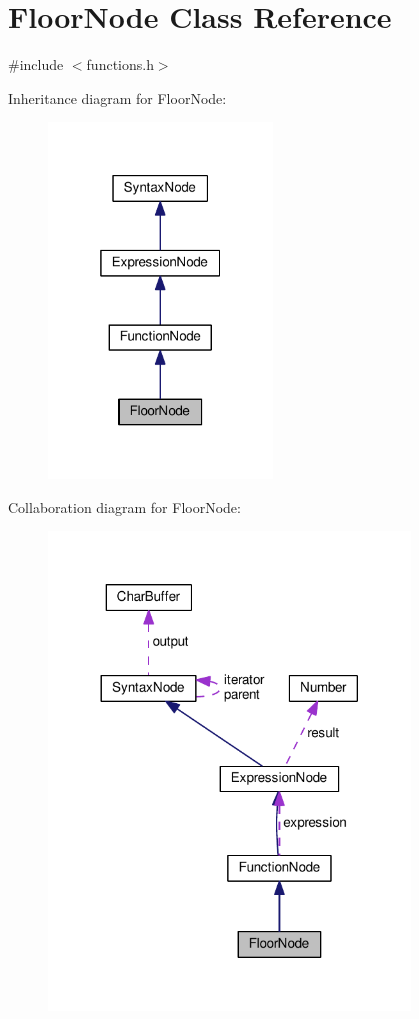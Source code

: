 \hypertarget{classFloorNode}{}\section{Floor\+Node Class Reference}
\label{classFloorNode}


{\ttfamily \#include $<$functions.\+h$>$}



Inheritance diagram for Floor\+Node\+:\nopagebreak
\begin{figure}[H]
\begin{center}
\leavevmode
\includegraphics[width=169pt]{classFloorNode__inherit__graph}
\end{center}
\end{figure}


Collaboration diagram for Floor\+Node\+:\nopagebreak
\begin{figure}[H]
\begin{center}
\leavevmode
\includegraphics[width=272pt]{classFloorNode__coll__graph}
\end{center}
\end{figure}
